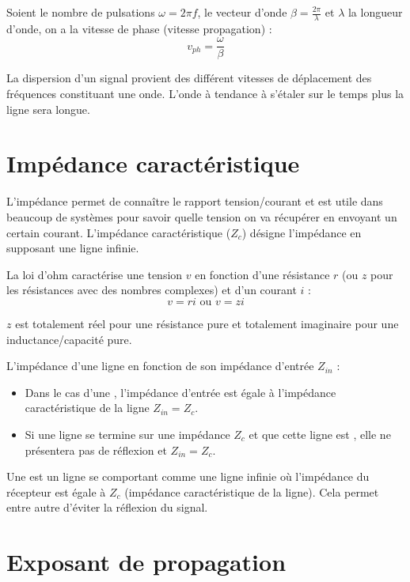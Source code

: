 Soient le nombre de pulsations $\omega = 2 \pi f$, le vecteur d'onde $\beta = \frac{2 \pi}{\lambda}$ et $\lambda$ la longueur d'onde, on a la vitesse de phase (vitesse propagation) :
\begin{equation*}
v_{ph} = \frac{\omega}{\beta}
\end{equation*}

La dispersion d'un signal provient des différent vitesses de déplacement des fréquences constituant une onde. L'onde à tendance à s'étaler sur le temps plus la ligne sera longue.

\section{Impédance caractéristique}

L'impédance permet de connaître le rapport tension/courant et est utile dans beaucoup de systèmes pour savoir quelle tension on va récupérer en envoyant un certain courant. L'impédance caractéristique ($Z_c$) désigne l'impédance en supposant une ligne infinie.

La loi d'ohm caractérise une tension $v$ en fonction d'une résistance $r$ (ou $z$ pour les résistances avec des nombres complexes) et d'un courant $i$ :
\begin{equation*}
v = ri \text{ ou } v = zi
\end{equation*}

$z$ est totalement réel pour une résistance pure et totalement imaginaire pour une inductance/capacité pure.

L'impédance d’une ligne en fonction de son impédance d’entrée $Z_{in}$ :
\begin{itemize}
\item Dans le cas d'une , l'impédance d'entrée est égale à l'impédance caractéristique de la ligne $Z_{in} = Z_c$.
\item Si une ligne se termine sur une impédance $Z_c$ et que cette ligne est , elle ne présentera pas de réflexion et $Z_{in} = Z_c$.
\end{itemize}

Une  est un ligne se comportant comme une ligne infinie où l'impédance du récepteur est égale à $Z_c$ (impédance caractéristique de la ligne). Cela permet entre autre d'éviter la réflexion du signal.

\section{Exposant de propagation}


